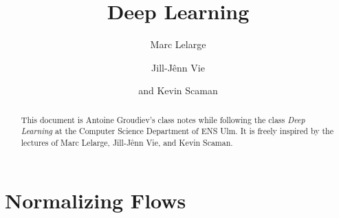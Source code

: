\documentclass[toc, titlepaged]{../cs-classes/cs-classes}
\title{Deep Learning}
\author{Marc Lelarge\and Jill-Jênn Vie\and and Kevin Scaman}
\begin{document}
\begin{abstract}
    This document is Antoine Groudiev's class notes while following the class \emph{Deep Learning} at the Computer Science Department of ENS Ulm. It is freely inspired by the lectures of Marc Lelarge, Jill-Jênn Vie, and Kevin Scaman.
\end{abstract}





% 









\section{Normalizing Flows}
\end{document}

